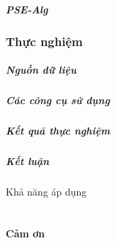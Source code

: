 \documentclass{beamer}
\begin{document}
\begin{frame}
  \frametitle{PSE-Alg}
  
\end{frame}


\section{Thực nghiệm}

\begin{frame}
  \frametitle{Nguồn dữ liệu}
  
\end{frame}

\begin{frame}
  \frametitle{Các công cụ sử dụng}
  
\end{frame}


\begin{frame}
  \frametitle{Kết quả thực nghiệm}
  
\end{frame}


\begin{frame}
  \frametitle{Kết luận}
  Khả năng áp dụng
\end{frame}


\part{}

\begin{frame}
  \begin{center}
    \begin{Huge}
      \textbf{Cảm ơn}
    \end{Huge}
\end{center}

\end{frame}
\end{document}
